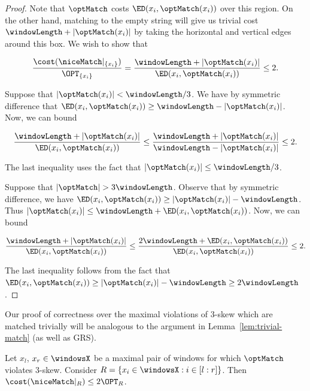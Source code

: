 \begin{proof}
    Note that $\optMatch$ costs $\ED(x_i, \optMatch(x_i))$ over this region. On the other hand, matching to the empty string will give us trivial cost $\windowLength + |\optMatch(x_i)|$ by taking the horizontal and vertical edges around this box. We wish to show that

    $$\frac{\cost(\niceMatch|_{\{x_i\}})}{\OPT_{\{x_i\}}} = \frac{\windowLength + |\optMatch(x_i)|}{\ED(x_i, \optMatch(x_i))} \leq 2.$$

    Suppose that $|\optMatch(x_i)| < \windowLength / 3$. We have by symmetric difference that $\ED(x_i, \optMatch(x_i)) \geq \windowLength - |\optMatch(x_i)|$. Now, we can bound

    $$\frac{\windowLength + |\optMatch(x_i)|}{\ED(x_i, \optMatch(x_i))} \leq \frac{\windowLength + |\optMatch(x_i)|}{\windowLength - |\optMatch(x_i)|} \leq 2.$$

    The last inequality uses the fact that $|\optMatch(x_i)| \leq \windowLength/3$.

    Suppose that $|\optMatch| > 3\windowLength$. Observe that by symmetric difference, we have $\ED(x_i, \optMatch(x_i)) \geq |\optMatch(x_i)| - \windowLength$. Thus $|\optMatch(x_i)| \leq \windowLength + \ED(x_i, \optMatch(x_i))$. Now, we can bound

    $$\frac{\windowLength + |\optMatch(x_i)|}{\ED(x_i, \optMatch(x_i))} \leq \frac{2\windowLength + \ED(x_i, \optMatch(x_i))}{\ED(x_i, \optMatch(x_i))} \leq 2.$$

    The last inequality follows from the fact that $\ED(x_i, \optMatch(x_i)) \geq |\optMatch(x_i)| - \windowLength \geq 2\windowLength$.
\end{proof}

Our proof of correctness over the maximal violations of $3$-skew which are matched trivially will be analogous to the argument in Lemma~\ref{lem:trivial-match} (as well as GRS).

\begin{lemma}
    \label{lem:3-skew}
    Let $x_l$, $x_r \in \windowsX$ be a maximal pair of windows for which $\optMatch$ violates $3$-skew. Consider $R = \{x_i \in \windowsX : i \in [l:r]\}$. Then $\cost(\niceMatch|_R) \leq 2\OPT_R$.
\end{lemma}

